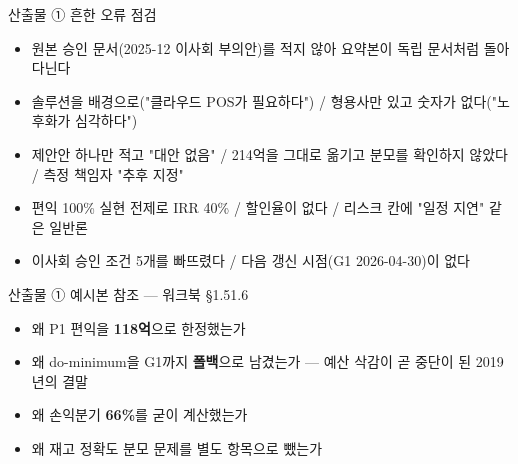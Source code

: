 \begin{frame}{산출물 ① 흔한 오류 점검}
\begin{itemize}
\item 원본 승인 문서(2025-12 이사회 부의안)를 적지 않아 요약본이 독립 문서처럼 돌아다닌다
\item 솔루션을 배경으로("클라우드 POS가 필요하다") / 형용사만 있고 숫자가 없다("노후화가 심각하다")
\item 제안안 하나만 적고 "대안 없음" / 214억을 그대로 옮기고 분모를 확인하지 않았다 / 측정 책임자 "추후 지정"
\item 편익 100\% 실현 전제로 IRR 40\% / 할인율이 없다 / 리스크 칸에 "일정 지연" 같은 일반론
\item 이사회 승인 조건 5개를 빠뜨렸다 / 다음 갱신 시점(G1 2026-04-30)이 없다
\end{itemize}
\end{frame}

\begin{frame}{산출물 ① 예시본 참조 — 워크북 §1.5\til{}1.6}
\begin{itemize}
\item 왜 P1 편익을 \textbf{118억}으로 한정했는가
\item 왜 do-minimum을 G1까지 \textbf{폴백}으로 남겼는가 — 예산 삭감이 곧 중단이 된 2019년의 결말
\item 왜 손익분기 \textbf{66\%}를 굳이 계산했는가
\item 왜 재고 정확도 분모 문제를 별도 항목으로 뺐는가
\end{itemize}
\end{frame}


